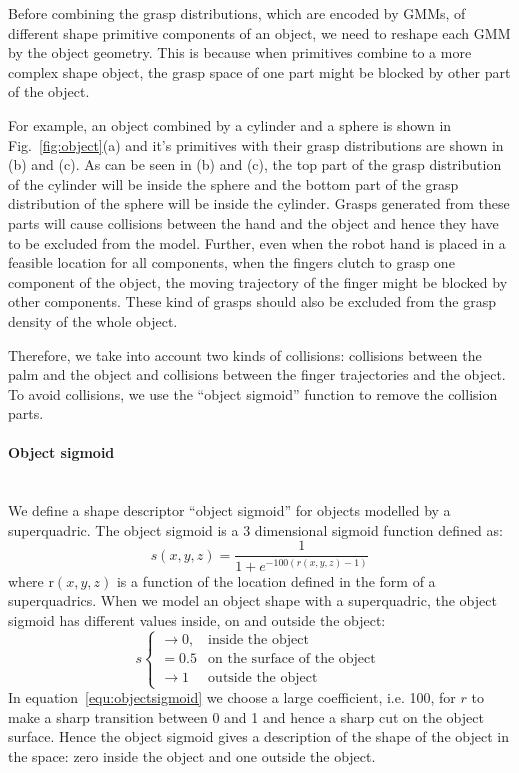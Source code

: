 Before combining the grasp distributions, which are encoded by GMMs, of different shape primitive components of an object, we need to reshape each GMM by the object geometry. This is because when primitives combine to a more complex shape object, the grasp space of one part might be blocked by other part of the object.

For example, an object combined by a cylinder and a sphere is shown in Fig.~\ref{fig:object}(a) and it's primitives with their grasp distributions are shown in (b) and (c). As can be seen in (b) and (c), the top part of the grasp distribution of the cylinder will be inside the sphere and the bottom part of the grasp distribution of the sphere will be inside the cylinder. Grasps generated from these parts will cause collisions between the hand and the object and hence they have to be excluded from the model. Further, even when the robot hand is placed in a feasible location for all components, when the fingers clutch to grasp one component of the object, the moving trajectory of the finger might be blocked by other components. These kind of grasps should also be excluded from the grasp density of the whole object.

Therefore, we take into account two kinds of collisions: collisions between the palm and the object and collisions between the finger trajectories and the object. To avoid collisions, we use the ``object sigmoid'' function to remove the collision parts.

\paragraph{Object sigmoid} ~\\
\label{cha3:sec4:combine:sigmoid}
We define a shape descriptor ``object sigmoid'' for objects modelled by a superquadric. The object sigmoid is a 3 dimensional sigmoid function defined as:
\begin{equation}
s\left(x, y ,z\right) = \frac{1}{1+e^{-100\left(r\left(x, y ,z\right)-1\right)}}
\label{equ:objectsigmoid}
\end{equation}
where r$\left(x, y ,z\right)$ is a function of the location defined in the form of a superquadrics. When we model an object shape with a superquadric, the object sigmoid has different values inside, on and outside the object:
\begin{equation}
    s
    \begin{cases}
        \rightarrow0, & \text{inside the object}\  \\
        =0.5 & \text{on the surface of the object}\ \\
        \rightarrow1 & \text{outside the object}
    \end{cases}
\end{equation}
In equation~\ref{equ:objectsigmoid} we choose a large coefficient, i.e. 100, for $r$ to make a sharp transition between 0 and 1 and hence a sharp cut on the object surface. Hence the object sigmoid gives a description of the shape of the object in the space: zero inside the object and one outside the object.

